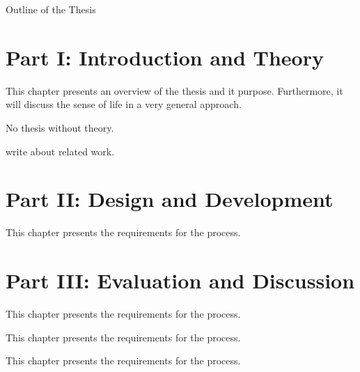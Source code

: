 \clearemptydoublepage

{}

\begin{center}
	\huge{Outline of the Thesis}
\end{center}




\section*{Part I: Introduction and Theory}

  \vspace{1mm}

\noindent  This chapter presents an overview of the thesis and it purpose. Furthermore, it will discuss the sense of life in a very general approach.  \\

  \vspace{1mm}

\noindent  No thesis without theory.   \\

  \vspace{1mm}

\noindent  write about related work.   \\

\section*{Part II: Design and Development}

  \vspace{1mm}

\noindent  This chapter presents the requirements for the process.

\section*{Part III: Evaluation and Discussion}

  \vspace{1mm}

\noindent  This chapter presents the requirements for the process. \\

  \vspace{1mm}

\noindent  This chapter presents the requirements for the process. \\

  \vspace{1mm}

\noindent  This chapter presents the requirements for the process. \\
